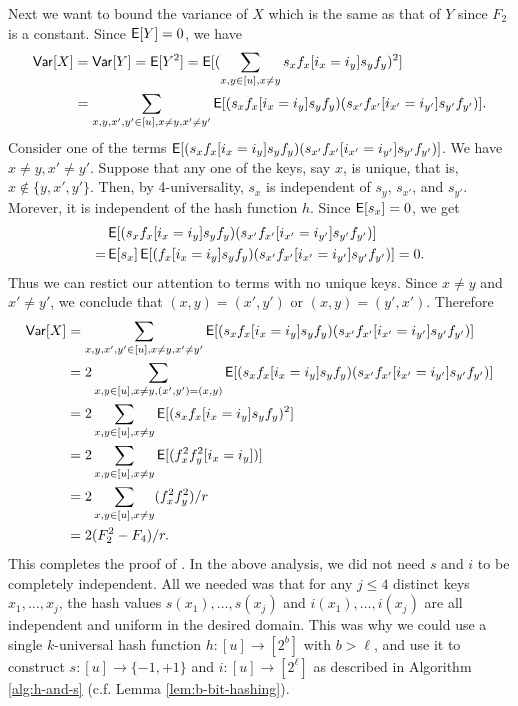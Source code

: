 Next we want to bound the variance of $X$ which is the same as
that of $Y$ since $F_2$ is a constant. Since
$\operatorname*{\sf{E}}[Y]=0$, we have
\begin{align*}
{\sf Var}[X]&={\sf Var}[Y]=\operatorname*{\sf{E}}[Y^2]=\operatorname*{\sf{E}}[(\sum_{x,y\in[u],x\neq y}s_x f_x[i_x=i_y]s_y f_y)^2]\\
&=\sum_{x,y,x',y'\in[u],x\neq y,x'\neq y'}\operatorname*{\sf{E}}[(s_x f_x[i_x=i_y]s_y f_y)
(s_{x'}f_{x'}[i_{x'}=i_{y'}]s_{y'} f_{y'})].
\end{align*}
Consider one of the terms $\operatorname*{\sf{E}}[(s_x f_x[i_x=i_y]s_y f_y)
(s_{x'}f_{x'}[i_{x'}=i_{y'}]s_{y'} f_{y'})]$. We have $x\neq y,x'\neq y'$. 
Suppose that any one of the keys,
say $x$, is unique, that is, $x\not\in\{y,x',y'\}$. Then, by
4-universality, $s_x$ is independent of $s_y$, $s_{x'}$, and $s_{y'}$.
Morever, it is independent of the hash function $h$. Since $\operatorname*{\sf{E}}[s_x]=0$,
we get
\begin{align*}
&\operatorname*{\sf{E}}[(s_x f_x[i_x=i_y]s_y f_y)
(s_{x'}f_{x'}[i_{x'}=i_{y'}]s_{y'} f_{y'})] \\
=&\operatorname*{\sf{E}}[s_x]\operatorname*{\sf{E}}[(f_x[i_x=i_y]s_y f_y) 
(s_{x'}f_{x'}[i_{x'}=i_{y'}]s_{y'} f_{y'})]=0.
\end{align*}
Thus we can restict our attention to terms with no unique keys. 
Since $x\neq y$ and $x'\neq y'$, we conclude that 
$(x,y)=(x',y')$ or $(x,y)=(y',x')$. Therefore
\begin{align*}
{\sf Var}[X]&=\sum_{x,y,x',y'\in[u],x\neq y,x'\neq y'}\operatorname*{\sf{E}}[(s_x f_x[i_x=i_y]s_y f_y)
(s_{x'}f_{x'}[i_{x'}=i_{y'}]s_{y'} f_{y'})]\\
       &=2\sum_{x,y\in[u],x\neq y,(x',y')=(x,y)}\operatorname*{\sf{E}}[(s_x f_x[i_x=i_y]s_y f_y)
(s_{x'}f_{x'}[i_{x'}=i_{y'}]s_{y'} f_{y'})]\\
&=2\sum_{x,y\in[u],x\neq y}\operatorname*{\sf{E}}[(s_x f_x[i_x=i_y]s_y f_y)^2]\\
&=2\sum_{x,y\in[u],x\neq y}\operatorname*{\sf{E}}[(f_x^2f_y^2[i_x=i_y])]\\
&=2\sum_{x,y\in[u],x\neq y}(f_x^2f_y^2)/r\\
&=2(F_2^2-F_4)/r.
\end{align*}
This completes the proof of . In the above analysis, we
did not need $s$ and $i$ to be completely independent. All we needed
was that for any $j\leq 4$ distinct keys $x_1,\ldots,x_j$, the hash
values $s(x_1),\ldots,s(x_j)$ and $i(x_1),\ldots,i(x_j)$ are all
independent and uniform in the desired domain. This was why we could
use a single $k$-universal hash function $h:[u]\to[2^b]$ with
$b>\ell$, and use it to construct $s:[u]\to\{-1,+1\}$ and
$i:[u]\to[2^\ell]$ as described in Algorithm \ref{alg:h-and-s}
(c.f. Lemma \ref{lem:b-bit-hashing}).




